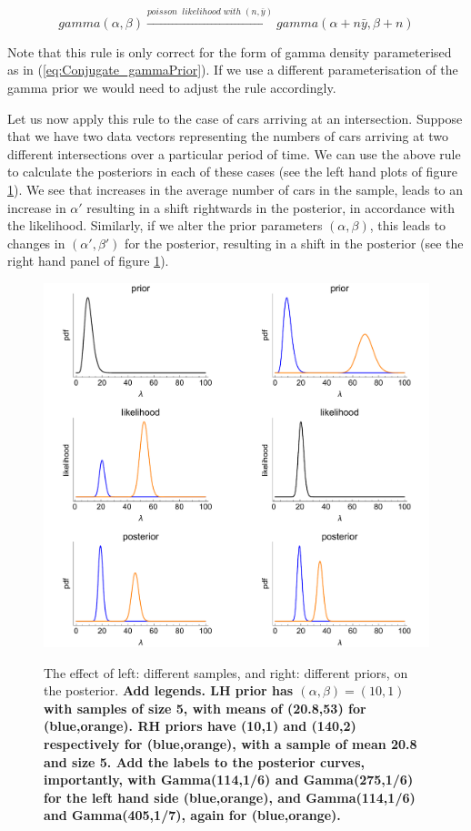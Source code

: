 \documentclass[11pt,fullpage]{book}
\begin{document}
\begin{equation}
gamma(\alpha,\beta)\xrightarrow{poisson\;\; likelihood\; with\; (n, \bar{y})} gamma(\alpha + n \bar{y}, \beta + n)
\end{equation}

Note that this rule is only correct for the form of gamma density parameterised as in (\ref{eq:Conjugate_gammaPrior}). If we use a different parameterisation of the gamma prior we would need to adjust the rule accordingly.

Let us now apply this rule to the case of cars arriving at an intersection. Suppose that we have two data vectors representing the numbers of cars arriving at two different intersections over a particular period of time. We can use the above rule to calculate the posteriors in each of these cases (see the left hand plots of figure \ref{fig:Conjugate_poissonGamma}). We see that increases in the average number of cars in the sample, leads to an increase in $\alpha'$ resulting in a shift rightwards in the posterior, in accordance with the likelihood. Similarly, if we alter the prior parameters $(\alpha,\beta)$, this leads to changes in $(\alpha',\beta')$ for the posterior, resulting in a shift in the posterior (see the right hand panel of figure \ref{fig:Conjugate_poissonGamma}).

\begin{figure}
\centering
\scalebox{0.3} 
{\includegraphics{Conjugate_poissonGamma.pdf}}
\caption{The effect of left: different samples, and right: different priors, on the posterior. \textbf{Add legends. LH prior has $(\alpha,\beta)= (10,1)$ with samples of size 5, with means of (20.8,53) for (blue,orange). RH priors have (10,1) and (140,2) respectively for (blue,orange), with a sample of mean 20.8 and size 5. Add the labels to the posterior curves, importantly, with Gamma(114,1/6) and Gamma(275,1/6) for the left hand side (blue,orange), and Gamma(114,1/6) and Gamma(405,1/7), again for (blue,orange).}}\label{fig:Conjugate_poissonGamma}
\end{figure}
\end{document}
